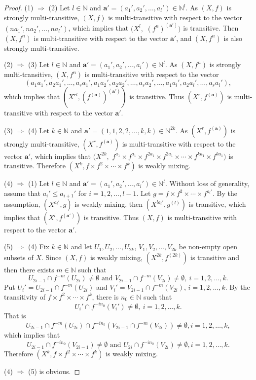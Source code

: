 \documentclass[12pt,a4paper]{amsart}
\theoremstyle{definition}
\numberwithin{equation}{section}
\begin{document}
\begin{proof}
(1) $\Rightarrow$ (2) Let $l\in\mathbb{N}$ and $\mathbf{a}'=(a_1',a_2',\dotsc,a_l')\in\mathbb{N}^l$.
As $(X,f)$ is strongly multi-transitive,
$(X,f)$ is multi-transitive with respect to the vector $(na_1',na_2',\dotsc,na_l')$,
which implies that $(X^l, $ $(f^{n})^{(\mathbf{a}')})$ is transitive.
Then $(X,f^n)$ is multi-transitive with respect to the vector $\mathbf{a}'$,
and $(X,f^n)$ is also strongly multi-transitive.

(2) $\Rightarrow$ (3) Let $l\in\mathbb{N}$ and $\mathbf{a}'=(a_1',a_2',\dotsc,a_l')\in\mathbb{N}^l$.
As $(X,f^n)$ is strongly multi-transitive, $(X,f^n)$ is multi-transitive with respect to the vector
$$(a_1a_1',a_2a_1',\dotsc,a_ra_1',a_1a_2',a_2a_2',\dotsc,a_ra_2',\dotsc,a_1a_l',a_2a_l',\dotsc,a_ra_l'),$$
which implies that
$(X^{rl},(f^{(\mathbf{a})})^{(\mathbf{a}')})$ is transitive.
Thus $(X^r,f^{(\mathbf{a})})$ is multi-transitive with respect to the vector $\mathbf{a}'$.

(3) $\Rightarrow$ (4) Let $k\in\mathbb{N}$ and $\mathbf{a}'=(1,1,2,2,\dotsc,k,k)\in\mathbb{N}^{2k}$.
As $(X^r,f^{(\mathbf{a})})$ is strongly multi-transitive,
$(X^r, f^{(\mathbf{a})})$ is multi-transitive with respect to the vector $\mathbf{a}'$,
which implies that
$(X^{2k}, $ $f^{a_1}\times f^{a_1}\times f^{2a_1}\times f^{2a_1}\times\dotsb\times f^{ka_1}\times f^{ka_1})$
is transitive. Therefore $(X^k,f\times f^2\times \dotsb \times f^k)$ is weakly mixing.

(4) $\Rightarrow$ (1)
Let $l\in\mathbb{N}$ and $\mathbf{a}'=(a_1',a_2',\dotsc,a_l')\in\mathbb{N}^l$.
Without loss of generality, assume that $a_i'\leq a_{i+1}'$ for $i=1,2,\dotsc,l-1$.
Let $g =f\times f^2\times\dotsb \times f^{a_l'}$. By the assumption, $(X^{a_l'},g)$ is weakly mixing,
then $(X^{la_l'}, g^{(l)})$ is transitive, which implies that
$(X^l,f^{(\mathbf{a}')})$ is transitive.
Thus $(X,f)$ is multi-transitive with respect to the vector $\mathbf{a}'$.

(5) $\Rightarrow$ (4)
Fix $k\in\mathbb{N}$ and let $U_1,U_2,\dotsc, U_{2k}$,
$V_1,V_2,\dotsc,V_{2k}$ be non-empty open subsets of $X$.
Since $(X,f)$ is weakly mixing,
$(X^{2k},f^{(2k)})$ is transitive and then there exists $m\in\mathbb{N}$
such that
\[U_{2i-1}\cap f^{-m}(U_{2i})\neq \emptyset\text{ and }V_{2i-1}\cap f^{-m}(V_{2i})\neq \emptyset,\ i=1,2,\dotsc, k. \]
Put  $U_i'=U_{2i-1}\cap f^{-m}(U_{2i})$ and $V_i'=V_{2i-1}\cap f^{-m}(V_{2i})$, $i=1,2,\dotsc, k$.
By the transitivity of $f\times f^2\times\dotsb\times f^k$,
there is $n_0\in \mathbb{N}$ such that
\[U_i'\cap f^{-i n_0}(V_i')\neq \emptyset,\ i=1,2,\dotsc, k.\]
That is
\[U_{2i-1}\cap f^{-m}(U_{2i})\cap f^{-in_0}(V_{2i-1}\cap f^{-m}(V_{2i}))\neq \emptyset, i=1,2,\dotsc, k,\]
which implies that
\[U_{2i-1}\cap f^{-in_0}(V_{2i-1})\neq\emptyset\text{ and }
U_{2i}\cap f^{-in_0}(V_{2i})\neq\emptyset, i=1,2,\dotsc, k. \]
Therefore $(X^k,f\times f^2\times \dotsb \times f^k)$ is weakly mixing.

(4) $\Rightarrow$ (5) is obvious.
\end{proof}
\end{document}
